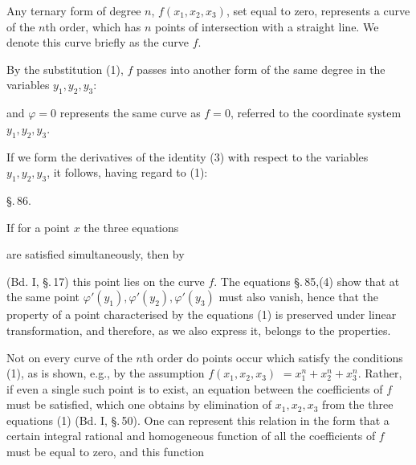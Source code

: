 Any ternary form of degree $n$, $f(x_1, x_2, x_3)$, set equal to zero,
represents a curve of the $n$th order, which has $n$ points of intersection
with a straight line. We denote this curve briefly as the curve $f$.

By the substitution (1), $f$ passes into another form of the same degree in the variables $y_1, y_2, y_3$:


\noindent and $\varphi = 0$ represents the same curve as $f = 0$, referred to
the coordinate system $y_1, y_2, y_3$.

If we form the derivatives of the identity (3) with respect to the
variables $y_1, y_2, y_3$, it follows, having regard to (1):


\begin{center}
\S.\,86.

\end{center}

If for a point $x$ the three equations


\noindent are satisfied simultaneously, then by 


\noindent (Bd. I, \S.\,17) this point lies on the curve $f$. The equations \S.\,85,(4)
show that at the same point $\varphi'(y_1), \varphi'(y_2), \varphi'(y_3)$
must also vanish, hence that the property of a point characterised by the
equations (1) is preserved under linear transformation, and therefore, as we
also express it, belongs to the  properties.

Not on every curve of the $n$th order do points occur which satisfy
the conditions (1), as is shown, e.g., by the assumption $f(x_1, x_2, x_3)$
$= x_1^n + x_2^n + x_3^n$. Rather, if even a single such point is to exist,
an equation between the coefficients of $f$ must be satisfied, which one
obtains by elimination of $x_1, x_2, x_3$ from the three equations (1) (Bd. I, \S.\,50).
One can represent this relation in the form that a certain integral
rational and homogeneous function of all the coefficients of $f$ must be
equal to zero, and this function
